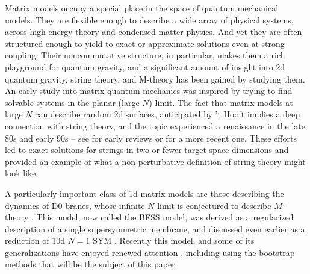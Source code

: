 \documentclass[a4paper,11pt]{article}
\numberwithin{equation}{section}
\begin{document}
Matrix models occupy a special place in the space of quantum mechanical models. They are flexible enough to describe a wide array of physical systems, across high energy theory and condensed matter physics. And yet they are often structured enough to yield to exact or approximate solutions even at strong coupling. Their noncommutative structure, in particular, makes them a rich playground for quantum gravity, and a significant amount of insight into 2d quantum gravity, string theory, and M-theory has been gained by studying them. An early study into matrix quantum mechanics \cite{Brezin:1977sv} was inspired by trying to find solvable systems in the planar (large $N$) limit. The fact that matrix models at large $N$ can describe random 2d surfaces, anticipated by 't Hooft \cite{tHooft:1973alw} implies a deep connection with string theory, and the topic experienced a renaissance in the late 80s and early 90s -- see \cite{Klebanov:1991qa, Ginsparg:1993is, Polchinski:1994mb} for early reviews or \cite{Anninos:2020ccj} for a more recent one. These efforts led to exact solutions for strings in two or fewer target space dimensions and provided an example of what a non-perturbative definition of string theory might look like. 

A particularly important class of 1d matrix models are those describing the dynamics of D0 branes, whose infinite-$N$ limit is conjectured to describe $M$-theory \cite{Banks:1996vh, Susskind:1997cw}. This model, now called the BFSS model, was derived \cite{deWit:1988wri} as a regularized description of a single supersymmetric membrane, and discussed even earlier as a reduction of 10d $N = 1$ SYM \cite{Baake:1984ie, Flume:1984mn, Claudson:1984th}. Recently this model, and some of its generalizations \cite{Ishibashi:1996xs, Berenstein:2002jq} have enjoyed renewed attention \cite{Herderschee:2023pza, Herderschee:2023bnc, Komatsu:2024vnb, Komatsu:2024bop, Komatsu:2024ydh, Lin:2023owt, Lin:2024vvg}, including using the bootstrap methods that will be the subject of this paper.
\end{document}
